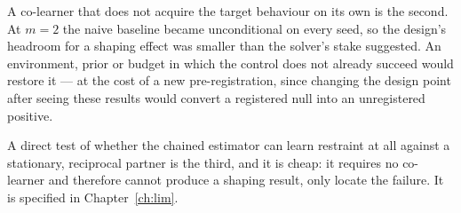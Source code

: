 A co-learner that does not acquire the target behaviour on its own is the
second.
At \(m=2\) the naive baseline became unconditional on every seed, so the
design's headroom for a shaping effect was smaller than the solver's stake
suggested.
An environment, prior or budget in which the control does not already
succeed would restore it --- at the cost of a new pre-registration, since
changing the design point after seeing these results would convert a
registered null into an unregistered positive.

A direct test of whether the chained estimator can learn restraint at all
against a stationary, reciprocal partner is the third, and it is cheap: it
requires no co-learner and therefore cannot produce a shaping result, only
locate the failure.
It is specified in Chapter~\ref{ch:lim}.
